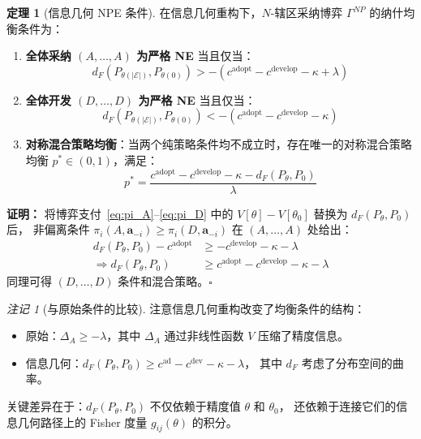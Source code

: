 \documentclass[12pt,a4paper]{article}
\theoremstyle{definition}
\newtheorem{theorem}{定理}[section]
\theoremstyle{remark}
\newtheorem{remark}{注记}[section]
\newcommand{\Fisher}{g}
\begin{document}
\begin{theorem}[信息几何 NPE 条件]\label{thm:ig_npe}
在信息几何重构下，$N$-辖区采纳博弈 $\Gamma^{NP}$ 的纳什均衡条件为：

\begin{enumerate}[label=(\alph*)]
    \item \textbf{全体采纳 $(A,\dots,A)$ 为严格 NE} 当且仅当：
    \begin{equation}
        d_F(P_{\theta(|\mathcal{E}|)}, P_{\theta(0)}) > - (c^{\text{adopt}} - c^{\text{develop}} - \kappa + \lambda) \label{eq:ig_AA_condition}
    \end{equation}

    \item \textbf{全体开发 $(D,\dots,D)$ 为严格 NE} 当且仅当：
    \begin{equation}
        d_F(P_{\theta(|\mathcal{E}|)}, P_{\theta(0)}) < - (c^{\text{adopt}} - c^{\text{develop}} - \kappa) \label{eq:ig_DD_condition}
    \end{equation}

    \item \textbf{对称混合策略均衡}：当两个纯策略条件均不成立时，存在唯一的对称混合策略均衡
    $p^* \in (0,1)$，满足：
    \begin{equation}
        p^* = \frac{c^{\text{adopt}} - c^{\text{develop}} - \kappa - d_F(P_\theta, P_0)}{\lambda} \label{eq:ig_pstar}
    \end{equation}
\end{enumerate}

\textbf{证明：} 将博弈支付~\eqref{eq:pi_A}--\eqref{eq:pi_D} 中的 $V[\theta] - V[\theta_0]$ 替换为 $d_F(P_\theta, P_0)$ 后，
非偏离条件 $\pi_i(A, \mathbf{a}_{-i}) \geq \pi_i(D, \mathbf{a}_{-i})$ 在 $(A,\dots,A)$ 处给出：
\begin{align*}
    d_F(P_\theta, P_0) - c^{\text{adopt}} &\geq -c^{\text{develop}} - \kappa - \lambda \\
    \Rightarrow d_F(P_\theta, P_0) &\geq c^{\text{adopt}} - c^{\text{develop}} - \kappa - \lambda
\end{align*}
同理可得 $(D,\dots,D)$ 条件和混合策略。$\square$
\end{theorem}

\begin{remark}[与原始条件的比较]
注意信息几何重构改变了均衡条件的结构：
\begin{itemize}
    \item 原始：$\Delta_A \geq -\lambda$，其中 $\Delta_A$ 通过非线性函数 $V$ 压缩了精度信息。
    \item 信息几何：$d_F(P_\theta, P_0) \geq c^{\text{ad}} - c^{\text{dev}} - \kappa - \lambda$，
    其中 $d_F$ 考虑了分布空间的曲率。
\end{itemize}
关键差异在于：$d_F(P_\theta, P_0)$ 不仅依赖于精度值 $\theta$ 和 $\theta_0$，
还依赖于连接它们的信息几何路径上的 Fisher 度量 $\Fisher_{ij}(\theta)$ 的积分。
\end{remark}
\end{document}

